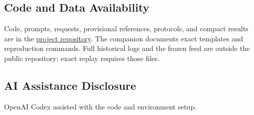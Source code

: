 \documentclass[a4paper,twoside]{article}
\begin{document}
\subsection*{Code and Data Availability}
Code, prompts, requests, provisional references, protocols, and compact results are in the \href{https://github.com/mantzaris/LLMplanningContraintsDecision}{project repository}. The companion documents exact templates and reproduction commands. Full historical logs and the frozen feed are outside the public repository; exact replay requires those files.

\subsection*{AI Assistance Disclosure}
\label{sec:ai}
OpenAI Codex \cite{codex} assisted with the code and environment setup.
\end{document}
